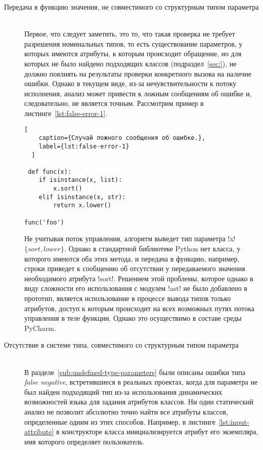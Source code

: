 \begin{description} 

\item[Передача в функцию значения, не совместимого со структурным типом параметра] \hfill \\ 
  Первое, что следует заметить, это то, что такая проверка не требует разрешения
  номинальных типов, то есть существование параметров, у которых имеются
  атрибуты, к которым происходит обращение, но для которых не было найдено
  подходящих классов (подраздел~\ref{sec:}), не должно повлиять на результаты
  проверки конкретного вызова на наличие ошибки. Однако в текущем виде, из-за
  нечувствительности к потоку исполнения, анализ может привести к ложным
  сообщениям об ошибке и, следовательно, не является точным. Рассмотрим пример в
  листинге~\ref{lst:false-error-1}. 

  \begin{lstlisting}[
    caption={Случай ложного сообщения об ошибке.},
    label={lst:false-error-1}
  ]

 def func(x):
    if isinstance(x, list):
        x.sort()
    elif isinstance(x, str):
        return x.lower()

func('foo')     
  \end{lstlisting}
    
  Не учитывая поток управления, алгоритм выведет тип параметра !x! $\{ sort,
  lower \}$. Однако в стандартной библиотеке Python нет класса, у которого
  имеются оба этих метода, и передача в функцию, например, строки приведет к сообщению об
  отсутствии у передаваемого значения необходимого атрибута !sort!. Решением
  этой проблемы, которое однако в виду сложности его использования с модулем
  !ast! не было добавлено в прототип, является использование в процессе вывода
  типов только атрибутов, доступ к которым происходит на всех возможных путях
  потока управления в теле функции. Однако это осуществимо в составе среды
  PyCharm.

\item[Отсутствие в системе типа, совместимого со структурным типом параметра]
  \hfill \\

  В разделе~\ref{sub:undefined-type-parameters} были описаны ошибки типа
  \emph{false negative}, встретившиеся в реальных проектах, когда для параметра
  не был найден подходящий тип из-за использования динамических возможностей
  языка для задания атрибутов классов. Ни один
  статический анализ не позволит абсолютно точно найти все атрибуты классов,
  определенные одним из этих способов. Например, в
  листинге~\ref{lst:input-attribute} в конструкторе класса инициализируется
  атрибут его экземпляра, имя которого определяет пользователь.


\end{description}

